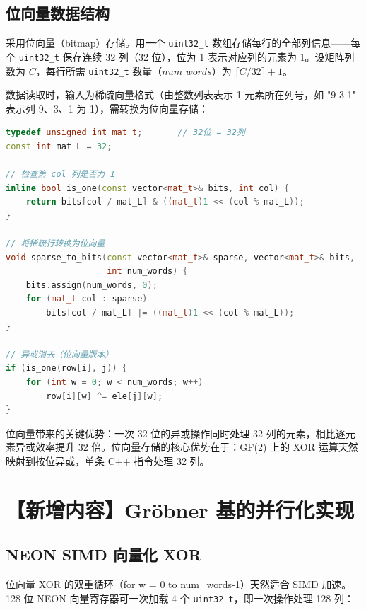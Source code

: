 \documentclass[a4paper]{article}
\begin{document}
\subsection{位向量数据结构}

采用位向量（bitmap）存储。用一个 \texttt{uint32\_t} 数组存储每行的全部列信息——每个 \texttt{uint32\_t} 保存连续 32 列（32 位），位为 1 表示对应列的元素为 1。设矩阵列数为 $C$，每行所需 \texttt{uint32\_t} 数量（$num\_words$）为 $\lceil C/32 \rceil + 1$。

数据读取时，输入为稀疏向量格式（由整数列表表示 1 元素所在列号，如 "9 3 1" 表示列 9、3、1 为 1），需转换为位向量存储：

\begin{lstlisting}[title=位向量数据结构与异或操作,frame=trbl,language={C++}]
typedef unsigned int mat_t;       // 32位 = 32列
const int mat_L = 32;

// 检查第 col 列是否为 1
inline bool is_one(const vector<mat_t>& bits, int col) {
    return bits[col / mat_L] & ((mat_t)1 << (col % mat_L));
}

// 将稀疏行转换为位向量
void sparse_to_bits(const vector<mat_t>& sparse, vector<mat_t>& bits,
                    int num_words) {
    bits.assign(num_words, 0);
    for (mat_t col : sparse)
        bits[col / mat_L] |= ((mat_t)1 << (col % mat_L));
}

// 异或消去（位向量版本）
if (is_one(row[i], j)) {
    for (int w = 0; w < num_words; w++)
        row[i][w] ^= ele[j][w];
}
\end{lstlisting}

位向量带来的关键优势：一次 32 位的异或操作同时处理 32 列的元素，相比逐元素异或效率提升 32 倍。位向量存储的核心优势在于：GF(2) 上的 XOR 运算天然映射到按位异或，单条 C++ 指令处理 32 列。

\section{【新增内容】Gröbner 基的并行化实现}

\subsection{NEON SIMD 向量化 XOR}

位向量 XOR 的双重循环（for w = 0 to num\_words-1）天然适合 SIMD 加速。128 位 NEON 向量寄存器可一次加载 4 个 \texttt{uint32\_t}，即一次操作处理 128 列：
\end{document}
